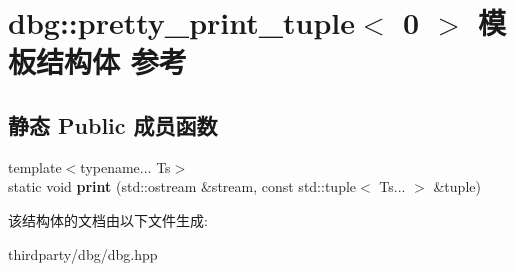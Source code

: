 \hypertarget{structdbg_1_1pretty__print__tuple_3_010_01_4}{}\section{dbg\+:\+:pretty\+\_\+print\+\_\+tuple$<$ 0 $>$ 模板结构体 参考}
\label{structdbg_1_1pretty__print__tuple_3_010_01_4}
\subsection*{静态 Public 成员函数}
\begin{DoxyCompactItemize}
\item 
\mbox{\label{structdbg_1_1pretty__print__tuple_3_010_01_4_a9961147d35a3bcc6b89af9610c68ad39}} 
{\footnotesize template$<$typename... Ts$>$ }\\static void {\bfseries print} (std\+::ostream \&stream, const std\+::tuple$<$ Ts... $>$ \&tuple)
\end{DoxyCompactItemize}


该结构体的文档由以下文件生成\+:\begin{DoxyCompactItemize}
\item 
thirdparty/dbg/dbg.\+hpp\end{DoxyCompactItemize}

